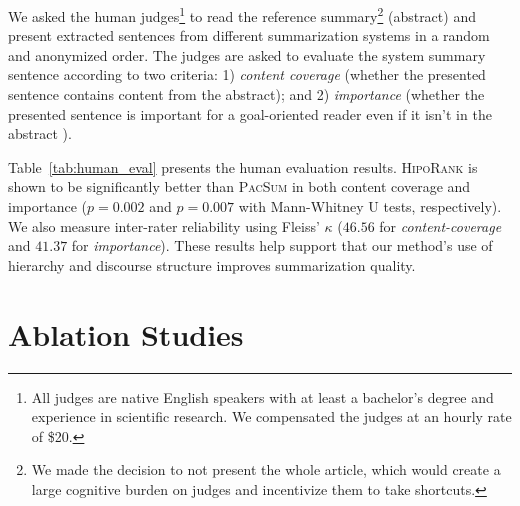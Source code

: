 \documentclass[11pt,a4paper]{article}
\begin{document}
We asked the human judges\footnote{All judges are native English speakers with at least a bachelor's degree and experience in scientific research. We compensated the judges at an hourly rate of \$20.} to read the reference summary\footnote{We made the decision to not present the whole article, which would create a large cognitive burden on judges and incentivize them to take shortcuts.} (abstract) and present extracted sentences from different summarization systems in a random and anonymized order. The judges are asked to evaluate the system summary sentence according to two criteria: 1) \textit{content coverage} (whether the presented sentence contains content from the abstract); and 2) \textit{importance} (whether the presented sentence is important for a goal-oriented reader even if it isn't in the abstract \citep{lin1997identifying}).

Table~\ref{tab:human_eval} presents the human evaluation results. 
\textsc{HipoRank} is shown to be significantly better than \textsc{PacSum} in  both content coverage and importance ($p=0.002$ and $p=0.007$ with Mann-Whitney U tests, respectively).
We also measure inter-rater reliability using Fleiss' $\kappa$ ($46.56$ for \textit{content-coverage} and $41.37$ for \textit{importance}). These results help support that our method's use of hierarchy and discourse structure  improves summarization quality.




\section{Ablation Studies}\label{sec:ablation}
\begin{table}[t!]
\centering
{}
\caption{\label{tab:ablation} Results on the PubMed validation set with different positional function or hierarchical information.}
\end{table}
    
\end{document}
